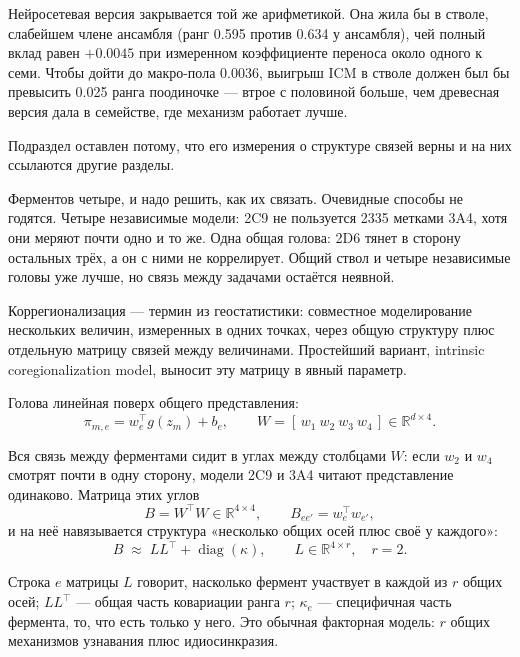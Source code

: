 Нейросетевая версия закрывается той же арифметикой. Она жила бы в стволе, слабейшем члене ансамбля
(ранг 0.595 против 0.634 у ансамбля), чей полный вклад равен $+0.0045$ при измеренном коэффициенте
переноса около одного к семи. Чтобы дойти до макро-пола 0.0036, выигрыш ICM в стволе должен был бы
превысить 0.025 ранга поодиночке --- втрое с половиной больше, чем древесная версия дала в семействе,
где механизм работает лучше.

Подраздел оставлен потому, что его измерения о структуре связей верны и на них ссылаются другие
разделы.

Ферментов четыре, и надо решить, как их связать. Очевидные способы не годятся. Четыре независимые модели:
2C9 не пользуется 2335 метками 3A4, хотя они меряют почти одно и то же. Одна общая голова: 2D6 тянет
в сторону остальных трёх, а он с ними не коррелирует. Общий ствол и четыре независимые головы уже лучше,
но связь между задачами остаётся неявной.

Коррегионализация --- термин из геостатистики: совместное моделирование нескольких величин, измеренных
в одних точках, через общую структуру плюс отдельную матрицу связей между величинами. Простейший вариант,
intrinsic coregionalization model, выносит эту матрицу в явный параметр.

Голова линейная поверх общего представления:
\begin{equation}
\pi_{m,e} = w_e^{\top} g(z_m) + b_e,
\qquad W = [\,w_1\ w_2\ w_3\ w_4\,] \in \mathbb{R}^{d\times 4} .
\label{eq:head}
\end{equation}

Вся связь между ферментами сидит в углах между столбцами $W$: если $w_2$ и $w_4$ смотрят почти в одну
сторону, модели 2C9 и 3A4 читают представление одинаково. Матрица этих углов
\begin{equation}
B = W^{\top}W \in \mathbb{R}^{4\times 4}, \qquad B_{ee'} = w_e^{\top} w_{e'} ,
\end{equation}
и на неё навязывается структура «несколько общих осей плюс своё у каждого»:
\begin{equation}
B \;\approx\; LL^{\top} + \operatorname{diag}(\kappa),
\qquad L \in \mathbb{R}^{4\times r},\quad r = 2 .
\label{eq:icm}
\end{equation}

Строка $e$ матрицы $L$ говорит, насколько фермент участвует в каждой из $r$ общих осей; $LL^{\top}$ ---
общая часть ковариации ранга $r$; $\kappa_e$ --- специфичная часть фермента, то, что есть только у него.
Это обычная факторная модель: $r$ общих механизмов узнавания плюс идиосинкразия.

